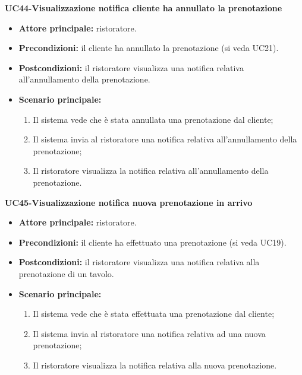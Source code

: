\textbf{UC44-Visualizzazione notifica cliente ha annullato la prenotazione}
\begin{itemize}
\item \textbf{Attore principale:} ristoratore.
\item \textbf{Precondizioni:} il cliente ha annullato la prenotazione (si veda UC21).
\item \textbf{Postcondizioni:} il ristoratore visualizza una notifica relativa all'annullamento della prenotazione.
\item \textbf{Scenario principale:}
\begin{enumerate}
    \item Il sistema vede che è stata annullata una prenotazione dal cliente;
    \item Il sistema invia al ristoratore una notifica relativa all'annullamento della prenotazione;
    \item Il ristoratore visualizza la notifica relativa all'annullamento della prenotazione.
\end{enumerate}
\end{itemize}

\textbf{UC45-Visualizzazione notifica nuova prenotazione in arrivo}
\begin{itemize}
\item \textbf{Attore principale:} ristoratore.
\item \textbf{Precondizioni:} il cliente ha effettuato una prenotazione (si veda UC19).
\item \textbf{Postcondizioni:} il ristoratore visualizza una notifica relativa alla prenotazione di un tavolo.
\item \textbf{Scenario principale:}
\begin{enumerate}
    \item Il sistema vede che è stata effettuata una prenotazione dal cliente;
    \item Il sistema invia al ristoratore una notifica relativa ad una nuova prenotazione;
    \item Il ristoratore visualizza la notifica relativa alla nuova prenotazione.
\end{enumerate}
\end{itemize}

